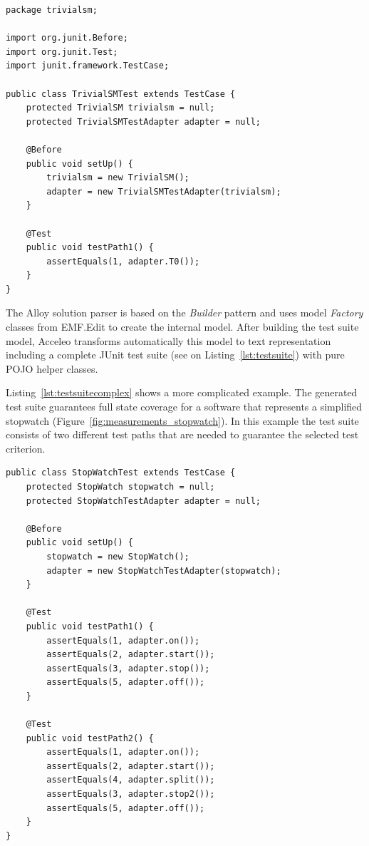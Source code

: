 \begin{lstlisting}[label={lst:testsuite}, caption=Generated JUnit test suite,breaklines=true]
package trivialsm;

import org.junit.Before;
import org.junit.Test;
import junit.framework.TestCase;

public class TrivialSMTest extends TestCase {
	protected TrivialSM trivialsm = null;
	protected TrivialSMTestAdapter adapter = null;
	   
	@Before 
	public void setUp() {
		trivialsm = new TrivialSM();
		adapter = new TrivialSMTestAdapter(trivialsm);
	}
	
	@Test
	public void testPath1() {
		assertEquals(1, adapter.T0());
	}
}
\end{lstlisting}

The Alloy solution parser is based on the \textit{Builder} pattern \cite{designpatterns} and uses model \textit{Factory} classes from EMF.Edit to create the internal model. After building the test suite model, Acceleo transforms automatically this model to text representation including a complete JUnit test suite (see on Listing~\ref{lst:testsuite}) with pure POJO helper classes.

Listing~\ref{lst:testsuitecomplex} shows a more complicated example. The generated test suite guarantees full state coverage for a software that represents a simplified stopwatch (Figure~\ref{fig:measurements_stopwatch}). In this example the test suite consists of two different test paths that are needed to guarantee the selected test criterion.

\begin{lstlisting}[label={lst:testsuitecomplex}, caption=Test suite for a stopwatch (Figure~\ref{fig:measurements_stopwatch}),breaklines=true]
public class StopWatchTest extends TestCase {
	protected StopWatch stopwatch = null;
	protected StopWatchTestAdapter adapter = null;
	   
	@Before 
	public void setUp() {
		stopwatch = new StopWatch();
		adapter = new StopWatchTestAdapter(stopwatch);
	}

	@Test
	public void testPath1() {
		assertEquals(1, adapter.on());
		assertEquals(2, adapter.start());
		assertEquals(3, adapter.stop());
		assertEquals(5, adapter.off());
	}

	@Test
	public void testPath2() {
		assertEquals(1, adapter.on());
		assertEquals(2, adapter.start());
		assertEquals(4, adapter.split());
		assertEquals(3, adapter.stop2());
		assertEquals(5, adapter.off());
	}
}
\end{lstlisting}

